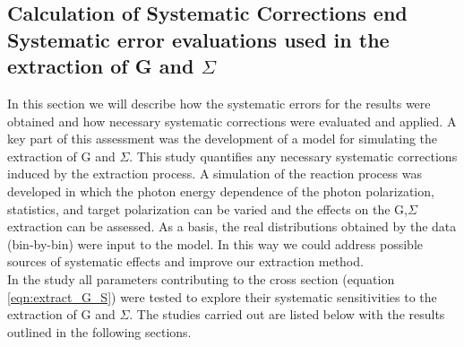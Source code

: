 \subsection{Calculation of Systematic Corrections end Systematic error evaluations used in  the extraction of G and \texorpdfstring{$\Sigma$}{Sigma}}
\label{ch:sys_corr}
In this section we will describe how the systematic errors for the results were obtained and how necessary systematic corrections were evaluated and applied. A key part of this assessment was the development of a model for simulating the extraction of G and $\Sigma$. This study  quantifies any necessary systematic corrections induced by the extraction process. A simulation of the reaction process was developed in which the photon energy dependence of the photon polarization, statistics, and target polarization can be varied and the effects on the G,$\Sigma$ extraction can be assessed. As a basis, the real distributions obtained by the data (bin-by-bin) were input to the model. In this way we could address possible sources of systematic effects and improve our extraction method. \\ 
In the study all parameters contributing to the cross section (equation \ref{eqn:extract_G_S}) were tested to explore their systematic sensitivities to the extraction of G and $\Sigma$. The studies carried out are listed below with the results outlined in the following sections.

